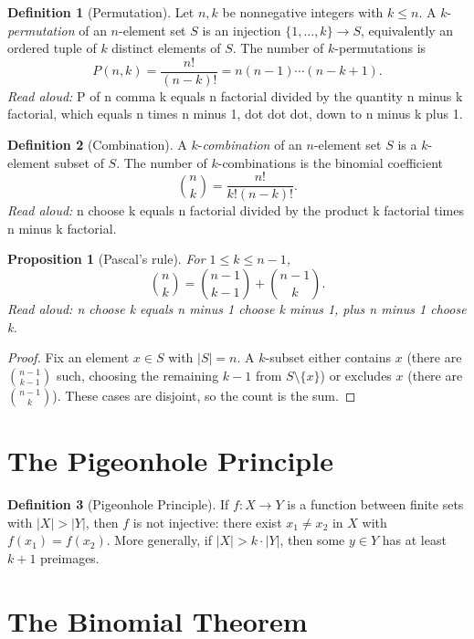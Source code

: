 \documentclass[11pt]{article}
\newtheorem{proposition}[theorem]{Proposition}
\theoremstyle{definition}
\newtheorem{definition}{Definition}
\theoremstyle{remark}
\begin{document}
\begin{definition}[Permutation]
Let $n,k$ be nonnegative integers with $k \leq n$. A $k$-\emph{permutation}
of an $n$-element set $S$ is an injection $\{1,\ldots,k\} \to S$,
equivalently an ordered tuple of $k$ distinct elements of $S$. The number
of $k$-permutations is
\[
  P(n,k) = \frac{n!}{(n-k)!} = n(n-1)\cdots(n-k+1).
\]
\emph{Read aloud:} P of n comma k equals n factorial divided by the
quantity n minus k factorial, which equals n times n minus 1, dot dot
dot, down to n minus k plus 1.
\end{definition}

\begin{definition}[Combination]
A $k$-\emph{combination} of an $n$-element set $S$ is a $k$-element subset
of $S$. The number of $k$-combinations is the binomial coefficient
\[
  \binom{n}{k} = \frac{n!}{k!(n-k)!}.
\]
\emph{Read aloud:} n choose k equals n factorial divided by the product
k factorial times n minus k factorial.
\end{definition}

\begin{proposition}[Pascal's rule]
For $1 \leq k \leq n-1$,
\[
  \binom{n}{k} = \binom{n-1}{k-1} + \binom{n-1}{k}.
\]
\emph{Read aloud:} n choose k equals n minus 1 choose k minus 1, plus
n minus 1 choose k.
\end{proposition}

\begin{proof}
Fix an element $x \in S$ with $|S|=n$. A $k$-subset either contains $x$
(there are $\binom{n-1}{k-1}$ such, choosing the remaining $k-1$ from
$S\setminus\{x\}$) or excludes $x$ (there are $\binom{n-1}{k}$). These
cases are disjoint, so the count is the sum.
\end{proof}

\section*{The Pigeonhole Principle}

\begin{definition}[Pigeonhole Principle]
If $f \colon X \to Y$ is a function between finite sets with $|X| > |Y|$,
then $f$ is not injective: there exist $x_1 \neq x_2$ in $X$ with
$f(x_1) = f(x_2)$. More generally, if $|X| > k \cdot |Y|$, then some
$y \in Y$ has at least $k+1$ preimages.
\end{definition}

\section*{The Binomial Theorem}
\end{document}
